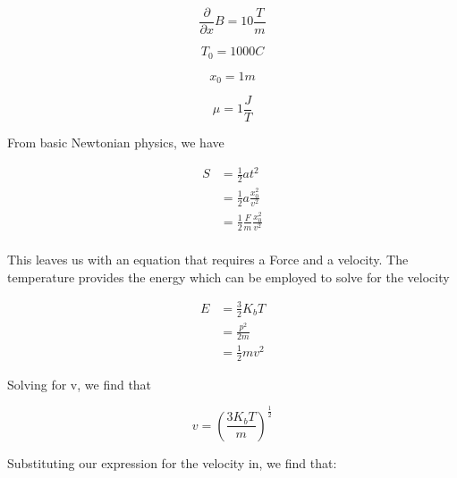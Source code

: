 \begin{answer}
  \begin{given}

    \begin{equation}
      \frac{\partial}{\partial x}B = 10 \frac T m
    \end{equation}

    \begin{equation}
      T_0 = 1000C
    \end{equation}

    \begin{equation}
      x_0 = 1m
    \end{equation}

    \begin{equation}
      \mu = 1 \frac J T
    \end{equation}

  \end{given}

  From basic Newtonian physics, we have

  \begin{equation}
    \begin{split}
      S &= \frac 1 2 a t^2 \\
      &= \frac 1 2 a \frac{x_0^2}{v^2} \\
      &= \frac 1 2 \frac F m \frac{x_0^2}{v^2} \\
    \end{split}
  \end{equation}

  This leaves us with an equation that requires a Force and a velocity.
  The temperature provides the energy which can be employed to solve for
  the velocity

  \begin{equation}
    \begin{split}
      E &= \frac 3 2 K_bT \\
      &= \frac{p^2}{2m} \\
      &= \frac 1 2 m v^2
    \end{split}
  \end{equation}

  Solving for v, we find that

  \begin{equation}
    v = \left(\frac{3 K_b T}{m}\right)^\frac{1}{2}
  \end{equation}

  Substituting our expression for the velocity in, we find that:


\end{answer}

